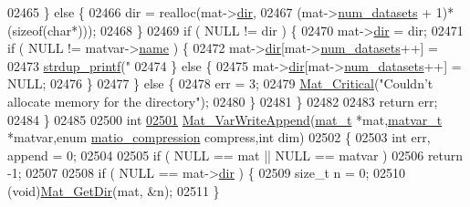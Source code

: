 \begin{DoxyCode}
{{{{{{{{{{{{{{{{{{{{{{{{{{{{{{{{{{{{{{{{{{{{02465         \} \textcolor{keywordflow}{else} \{
02466             dir = realloc(mat->\hyperlink{struct__mat__t_a1bc6c604459d0787801d5e53d365684c}{dir},
02467             (mat->\hyperlink{struct__mat__t_af37d0ba323e65edb27ecd5a2f766a3a4}{num\_datasets} + 1)*(\textcolor{keyword}{sizeof}(\textcolor{keywordtype}{char}*)));
02468         \}
02469         \textcolor{keywordflow}{if} ( NULL != dir ) \{
02470             mat->\hyperlink{struct__mat__t_a1bc6c604459d0787801d5e53d365684c}{dir} = dir;
02471             \textcolor{keywordflow}{if} ( NULL != matvar->\hyperlink{group___m_a_t_a5d4b55b041e3b4fb50c04337f05ad909}{name} ) \{
02472                 mat->\hyperlink{struct__mat__t_a1bc6c604459d0787801d5e53d365684c}{dir}[mat->\hyperlink{struct__mat__t_af37d0ba323e65edb27ecd5a2f766a3a4}{num\_datasets}++] =
02473                     \hyperlink{group__mat__util_ga291b08f933c75fb70e3736b669896ebd}{strdup\_printf}(\textcolor{stringliteral}{"%
02474             \} \textcolor{keywordflow}{else} \{
02475                 mat->\hyperlink{struct__mat__t_a1bc6c604459d0787801d5e53d365684c}{dir}[mat->\hyperlink{struct__mat__t_af37d0ba323e65edb27ecd5a2f766a3a4}{num\_datasets}++] = NULL;
02476             \}
02477         \} \textcolor{keywordflow}{else} \{
02478             err = 3;
02479             \hyperlink{group__mat__util_gaf51f2bfbb5580f575e4dd79757e2b80c}{Mat\_Critical}(\textcolor{stringliteral}{"Couldn't allocate memory for the directory"});
02480         \}
02481     \}
02482 
02483     \textcolor{keywordflow}{return} err;
02484 \}
02485 
02500 \textcolor{keywordtype}{int}
\hyperlink{group___m_a_t_ga9402f3f2fbec82fdb66bf1479c689727}{02501} \hyperlink{group___m_a_t_ga9402f3f2fbec82fdb66bf1479c689727}{Mat\_VarWriteAppend}(\hyperlink{struct__mat__t}{mat\_t} *mat,\hyperlink{group___m_a_t_structmatvar__t}{matvar\_t} *matvar,\textcolor{keyword}{enum} 
      \hyperlink{group___m_a_t_ga768c318af97bd2567758ecb001ceb7f4}{matio\_compression} compress,\textcolor{keywordtype}{int} dim)
02502 \{
02503     \textcolor{keywordtype}{int} err, append = 0;
02504 
02505     \textcolor{keywordflow}{if} ( NULL == mat || NULL == matvar )
02506         \textcolor{keywordflow}{return} -1;
02507 
02508     \textcolor{keywordflow}{if} ( NULL == mat->\hyperlink{struct__mat__t_a1bc6c604459d0787801d5e53d365684c}{dir} ) \{
02509         \textcolor{keywordtype}{size\_t} n = 0;
02510         (void)\hyperlink{group___m_a_t_ga7c0d94860d782366ab93d9b6b068eaea}{Mat\_GetDir}(mat, &n);
02511     \}
}}}}}}}}}}}}}}}}}}}}}}}}}}}}}}}}}}}}}}}}}}}}}
\end{DoxyCode}
